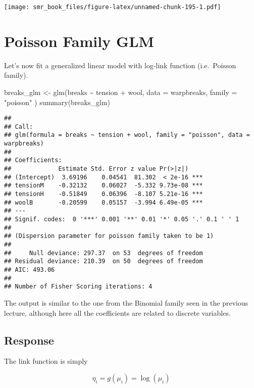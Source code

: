 \documentclass[
  oneside]{book}
\newenvironment{Shaded}{\begin{snugshade}}{\end{snugshade}}
\newcommand{\AttributeTok}[1]{\textcolor[rgb]{0.77,0.63,0.00}{#1}}
\newcommand{\FunctionTok}[1]{\textcolor[rgb]{0.00,0.00,0.00}{#1}}
\newcommand{\NormalTok}[1]{#1}
\newcommand{\OtherTok}[1]{\textcolor[rgb]{0.56,0.35,0.01}{#1}}
\newcommand{\SpecialCharTok}[1]{\textcolor[rgb]{0.00,0.00,0.00}{#1}}
\newcommand{\StringTok}[1]{\textcolor[rgb]{0.31,0.60,0.02}{#1}}
\begin{document}
\texttt{[image: smr\_book\_files/figure-latex/unnamed-chunk-195-1.pdf]}

\hypertarget{poisson-family-glm}{%
\section{Poisson Family GLM}\label{poisson-family-glm}}

Let's now fit a generalized linear model with log-link function
(i.e.~Poisson family).

\begin{Shaded}
\begin{Highlighting}[]
\NormalTok{breaks\_glm }\OtherTok{\textless{}{-}} \FunctionTok{glm}\NormalTok{(breaks }\SpecialCharTok{\textasciitilde{}}\NormalTok{ tension }\SpecialCharTok{+}\NormalTok{ wool,}
  \AttributeTok{data =}\NormalTok{ warpbreaks,}
  \AttributeTok{family =} \StringTok{"poisson"}
\NormalTok{)}
\FunctionTok{summary}\NormalTok{(breaks\_glm)}
\end{Highlighting}
\end{Shaded}

\begin{verbatim}
## 
## Call:
## glm(formula = breaks ~ tension + wool, family = "poisson", data = warpbreaks)
## 
## Coefficients:
##             Estimate Std. Error z value Pr(>|z|)    
## (Intercept)  3.69196    0.04541  81.302  < 2e-16 ***
## tensionM    -0.32132    0.06027  -5.332 9.73e-08 ***
## tensionH    -0.51849    0.06396  -8.107 5.21e-16 ***
## woolB       -0.20599    0.05157  -3.994 6.49e-05 ***
## ---
## Signif. codes:  0 '***' 0.001 '**' 0.01 '*' 0.05 '.' 0.1 ' ' 1
## 
## (Dispersion parameter for poisson family taken to be 1)
## 
##     Null deviance: 297.37  on 53  degrees of freedom
## Residual deviance: 210.39  on 50  degrees of freedom
## AIC: 493.06
## 
## Number of Fisher Scoring iterations: 4
\end{verbatim}

The output is similar to the one from the Binomial family seen
in the previous lecture, although here all the coefficients are
related to discrete variables.

\hypertarget{response}{%
\subsection{Response}\label{response}}

The link function is simply

\[
\eta_i = g(\mu_i) = \log(\mu_i)
\]
\end{document}
